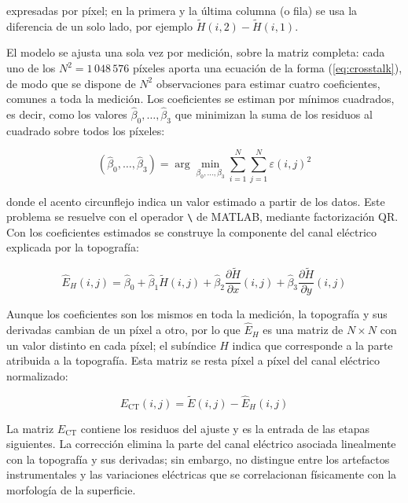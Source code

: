 expresadas por píxel; en la primera y la última columna (o fila) se usa la diferencia de un solo lado, por ejemplo $\tilde H(i,2) - \tilde H(i,1)$.

El modelo se ajusta una sola vez por medición, sobre la matriz completa: cada uno de los $N^2 = 1\,048\,576$ píxeles aporta una ecuación de la forma (\ref{eq:crosstalk}), de modo que se dispone de $N^2$ observaciones para estimar cuatro coeficientes, comunes a toda la medición. Los coeficientes se estiman por mínimos cuadrados, es decir, como los valores $\hat\beta_0, \dots, \hat\beta_3$ que minimizan la suma de los residuos al cuadrado sobre todos los píxeles:

\begin{equation}
(\hat\beta_0, \dots, \hat\beta_3) = \arg\min_{\beta_0, \dots, \beta_3} \sum_{i=1}^{N} \sum_{j=1}^{N} \varepsilon(i,j)^2
\label{eq:minimos_cuadrados}
\end{equation}

donde el acento circunflejo indica un valor estimado a partir de los datos. Este problema se resuelve con el operador \texttt{\textbackslash} de MATLAB, mediante factorización QR. Con los coeficientes estimados se construye la componente del canal eléctrico explicada por la topografía:

\begin{equation}
\hat E_H(i,j) = \hat\beta_0 + \hat\beta_1 \tilde H(i,j) + \hat\beta_2 \frac{\partial \tilde H}{\partial x}(i,j) + \hat\beta_3 \frac{\partial \tilde H}{\partial y}(i,j)
\label{eq:crosstalk_ajuste}
\end{equation}

Aunque los coeficientes son los mismos en toda la medición, la topografía y sus derivadas cambian de un píxel a otro, por lo que $\hat E_H$ es una matriz de $N\times N$ con un valor distinto en cada píxel; el subíndice $H$ indica que corresponde a la parte atribuida a la topografía. Esta matriz se resta píxel a píxel del canal eléctrico normalizado:

\begin{equation}
E_{\mathrm{CT}}(i,j) = \tilde E(i,j) - \hat E_H(i,j)
\label{eq:crosstalk_resta}
\end{equation}

La matriz $E_{\mathrm{CT}}$ contiene los residuos del ajuste y es la entrada de las etapas siguientes. La corrección elimina la parte del canal eléctrico asociada linealmente con la topografía y sus derivadas; sin embargo, no distingue entre los artefactos instrumentales y las variaciones eléctricas que se correlacionan físicamente con la morfología de la superficie.

